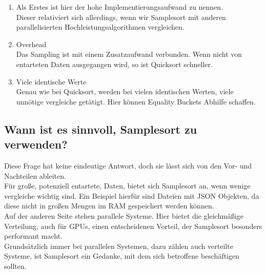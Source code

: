 		\begin{enumerate}
			\item Als Erstes ist hier der hohe Implementierungsaufwand zu nennen.\\
				Dieser relativiert sich allerdings, wenn wir Samplesort mit anderen parallelisierten Hochleistungsalgorithmen vergleichen.
			\item Overhead\\
				Das Sampling ist mit einem Zusatzaufwand verbunden.
				Wenn nicht von entarteten Daten ausgegangen wird, so ist Quicksort schneller.
			\item Viele identische Werte\\
				Genau wie bei Quicksort, werden bei vielen identischen Werten, viele unnötige vergleiche getätigt.
				Hier können Equality Buckets Abhilfe schaffen.
		\end{enumerate}
		
	\subsection{Wann ist es sinnvoll, Samplesort zu verwenden?}
		Diese Frage hat keine eindeutige Antwort, doch sie lässt sich von den Vor- und Nachteilen ableiten.\\
		Für große, potenziell entartete, Daten, bietet sich Samplesort an, wenn wenige vergleiche wichtig sind.
		Ein Beispiel hierfür sind Dateien mit JSON Objekten, da diese nicht in großen Mengen im RAM gespeichert werden können.\\
		Auf der anderen Seite stehen parallele Systeme. Hier bietet die gleichmäßige Verteilung, auch für GPUs, einen entscheidenen Vorteil, der Samplesort besonders performant macht.\\
		Grundsätzlich immer bei parallelen Systemen, dazu zählen auch verteilte Systeme, ist Samplesort ein Gedanke, mit dem sich betroffene beschäftigen sollten.
